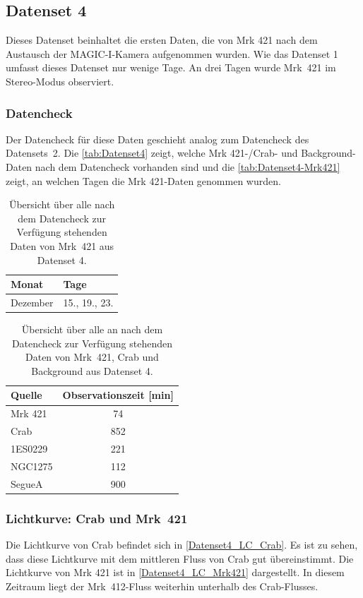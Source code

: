 \FloatBarrier

\subsection{Datenset 4}
\label{subsec:Datenset_4}
Dieses Datenset beinhaltet die ersten Daten, die von Mrk 421 nach dem Austausch der MAGIC-I-Kamera aufgenommen wurden. 
Wie das Datenset 1 umfasst dieses Datenset nur wenige Tage. 
An drei Tagen wurde Mrk~421 im Stereo-Modus observiert. 

\subsubsection{Datencheck}
Der Datencheck für diese Daten geschieht analog zum Datencheck des Datensets~2. 
Die \autoref{tab:Datenset4} zeigt, welche Mrk 421-/Crab- und Background-Daten nach dem Datencheck vorhanden sind und die \autoref{tab:Datenset4-Mrk421} zeigt, an welchen Tagen die Mrk 421-Daten genommen wurden.

\begin{table}[!h]
\centering
\caption{Übersicht über alle nach dem Datencheck zur Verfügung stehenden Daten von Mrk~421 aus Datenset 4.}
\label{tab:Datenset4-Mrk421}
\begin{tabular}{ll}
  \toprule
  Monat & Tage\\
  \midrule
  \midrule
Dezember & 15., 19., 23.\\
  \bottomrule
\end{tabular}
\end{table}


\begin{table}[!h]
\centering
\caption{Übersicht über alle an nach dem Datencheck zur Verfügung stehenden Daten von Mrk~421, Crab und Background aus Datenset 4.}
\label{tab:Datenset4}
\begin{tabular}{lc}
  \toprule
  Quelle & Observationszeit [min]\\
  \midrule
  \midrule
  Mrk 421 & 74\\
  \midrule
  Crab & 852\\
  \midrule
  1ES0229 & 221 \\
  NGC1275 & 112 \\
  SegueA & 900  \\
  \bottomrule
\end{tabular}
\end{table}

\subsubsection{Lichtkurve: Crab und Mrk~421}
Die Lichtkurve von Crab befindet sich in \autoref{Datenset4_LC_Crab}. 
Es ist zu sehen, dass diese Lichtkurve mit dem mittleren Fluss von Crab gut übereinstimmt.
Die Lichtkurve von Mrk 421 ist in \autoref{Datenset4_LC_Mrk421} dargestellt. 
In diesem Zeitraum liegt der Mrk~412-Fluss weiterhin unterhalb des Crab-Flusses.

